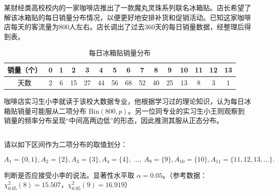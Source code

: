 \documentclass[12pt,a4paper]{article}
\begin{document}
某财经类高校校内的一家咖啡店推出了一款魔丸灵珠系列联名冰箱贴。店长希望了解该冰箱贴的每日销量分布情况，以便更好地安排补货和促销活动。已知这家咖啡店每天的客流量为800人左右。店长调出了过去360天的每日销量数据，经整理后得到表。

\begin{table}[htbp]
\centering
\caption{每日冰箱贴销量分布}
\label{tab:sales}
\renewcommand{\arraystretch}{1.2}
\begin{tabular}{c*{14}{c}}
\toprule
销量（个） & 0 & 1 & 2 & 3 & 4 & 5 & 6 & 7 & 8 & 9 & 10 & 11 & 12 & 13 \\
\midrule
天数 & 2 & 6 & 15 & 27 & 44 & 56 & 68 & 52 & 40 & 25 & 13 & 8 & 3 & 1 \\
\bottomrule
\end{tabular}
\end{table}

咖啡店实习生小李就读于该校大数据专业，他根据学习过的理论知识，认为每日冰箱贴销量可能服从二项分布 $\mathrm{Bin}(800,p)$。另一位同专业的实习生小王则观察到销量的频率分布呈现“中间高两边低”的形态，因此推测其服从正态分布。

\subsection{}

  请以如下区间作为二项分布的取值划分：

$$
A_1=\{0,1\},A_2=\{2\},A_3=\{3\},A_4=\{4\},\ \ldots,\ A_9=\{9\},A_{10}=\{10\},A_{11}=\{11,12,13,\ldots\}.
$$

  判断是否应接受小李的说法。显著性水平取 $\alpha=0.05$。（参考数据：$\chi^2_{0.05}(8)=15.507$，$\chi^2_{0.05}(9)=16.919$）
\end{document}

